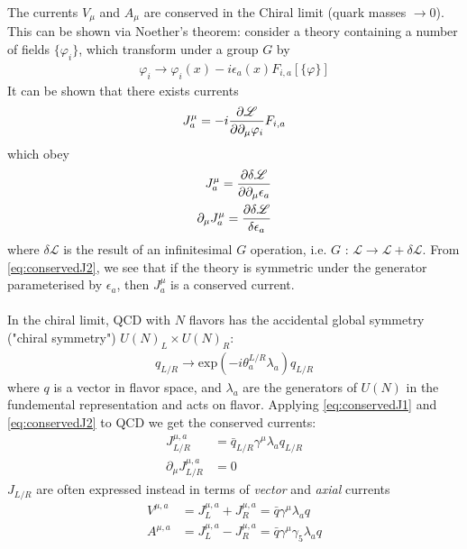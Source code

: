 The currents $V_{\mu}$ and $A_{\mu}$ are conserved in the Chiral limit (quark masses $\rightarrow 0$). This can be shown via Noether's theorem: consider a theory containing a number of fields $\{\varphi_i\}$, which transform under a group $G$ by
\begin{align}
	\varphi_i \rightarrow \varphi_i (x) - i\epsilon_a (x) F_{i,a}[\{\varphi\}]
\end{align}
It can be shown that there exists currents
\begin{align}
	J_a^{\mu} = -i{\partial \mathscr{L} \over \partial\partial_{\mu} \varphi_i} F_{i,a}
\end{align}
which obey
\begin{align}
	\label{eq:conservedJ1}
	J^{\mu}_a = {\partial \delta \mathscr{L} \over \partial \partial_{\mu} \epsilon_a } \\
	\partial_{\mu} J^{\mu}_a = {\partial \delta \mathscr{L} \over \delta \epsilon_a}	
	\label{eq:conservedJ2}
\end{align}
where $\delta\mathscr{L}$ is the result of an infinitesimal $G$ operation, i.e. $G$ : $\mathscr{L} \rightarrow \mathscr{L} + \delta\mathscr{L}$. From \eqref{eq:conservedJ2}, we see that if the theory is symmetric under the generator parameterised by $\epsilon_a$, then $J_a^{\mu}$ is a conserved current.
\\ \\
In the chiral limit, QCD with $N$ flavors has the accidental global symmetry ("chiral symmetry") $U(N)_L\times U(N)_R$:
\begin{align}
	q_{L/R} \rightarrow \text{exp}(-i\theta_a^{L/R} \lambda_a) q_{L/R}
	\label{eq:LRtransform}
\end{align} 
where $q$ is a vector in flavor space, and $\lambda_a$ are the generators of $U(N)$ in the fundemental representation and acts on flavor. Applying \eqref{eq:conservedJ1} and \eqref{eq:conservedJ2} to QCD we get the conserved currents:
\begin{align}
	J_{L/R}^{\mu,a} &= \bar{q}_{L/R} \gamma^{\mu} \lambda_a q_{L/R} \\
	\partial_{\mu} J_{L/R}^{\mu,a} &= 0
\end{align}
$J_{L/R}$ are often expressed instead in terms of {\it{vector}} and {\it{axial}} currents
\begin{align}
	V^{\mu,a} &= J^{\mu,a}_L + J^{\mu,a}_R = \bar{q} \gamma^{\mu} \lambda_a q \\
	A^{\mu,a} &= J^{\mu,a}_L - J^{\mu,a}_R = \bar{q} \gamma^{\mu} \gamma_5 \lambda_a q
\end{align}
